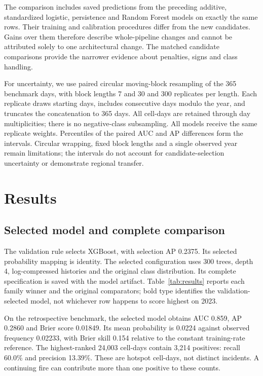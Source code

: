\documentclass[conference]{IEEEtran}
\begin{document}
The comparison includes saved predictions from the preceding additive, standardized logistic, persistence and Random Forest models on exactly the same rows. Their training and calibration procedures differ from the new candidates. Gains over them therefore describe whole-pipeline changes and cannot be attributed solely to one architectural change. The matched candidate comparisons provide the narrower evidence about penalties, signs and class handling.

For uncertainty, we use paired circular moving-block resampling of the 365 benchmark days, with block lengths 7 and 30 and 300 replicates per length. Each replicate draws starting days, includes consecutive days modulo the year, and truncates the concatenation to 365 days. All cell-days are retained through day multiplicities; there is no negative-class subsampling. All models receive the same replicate weights. Percentiles of the paired AUC and AP differences form the intervals. Circular wrapping, fixed block lengths and a single observed year remain limitations; the intervals do not account for candidate-selection uncertainty or demonstrate regional transfer.

\section{Results}
\subsection{Selected model and complete comparison}
The validation rule selects XGBoost, with selection AP 0.2375. Its selected probability mapping is identity. The selected configuration uses 300 trees, depth 4, log-compressed histories and the original class distribution. Its complete specification is saved with the model artifact. Table~\ref{tab:results} reports each family winner and the original comparators; bold type identifies the validation-selected model, not whichever row happens to score highest on 2023.

On the retrospective benchmark, the selected model obtains AUC 0.859, AP 0.2860 and Brier score 0.01849. Its mean probability is 0.0224 against observed frequency 0.02233, with Brier skill 0.154 relative to the constant training-rate reference. The highest-ranked 24,003 cell-days contain 3,214 positives: recall 60.0\% and precision 13.39\%. These are hotspot cell-days, not distinct incidents. A continuing fire can contribute more than one positive to these counts.
\end{document}
